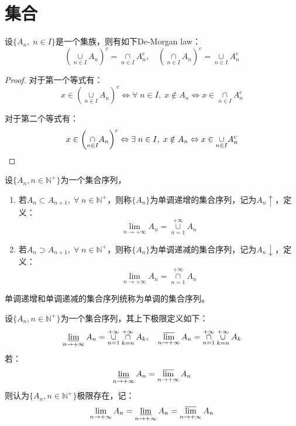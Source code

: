 \section{集合}

\begin{theorem}\label{theo:DeMorganLaw}
	设$\{A_n,\;n\in I\}$是一个集族，则有如下De-Morgan law：
	\begin{equation*}
		\left(\underset{n\in I}{\cup}A_n\right)^c=\underset{n\in I}{\cap}A_n^c,\quad
		\left(\underset{n\in I}{\cap}A_n\right)^c=\underset{n\in I}{\cup}A_n^c
	\end{equation*}
\end{theorem}
\begin{proof}
	对于第一个等式有：
	\begin{equation*}
		x\in\left(\underset{n\in I}{\cup}A_n\right)^c
		\Leftrightarrow
		\forall\;n\in I,\;x\notin A_n
		\Leftrightarrow
		x\in\underset{n\in I}{\cap}A_n^c
	\end{equation*}\par
	对于第二个等式有：
	\begin{equation*}
		x\in\left(\underset{n\in I}{\cap}A_n\right)^c
		\Leftrightarrow
		\exists\;n\in I,\;x\notin A_n
		\Leftrightarrow
		x\in\underset{n\in I}{\cup}A_n^c\qedhere
	\end{equation*}
\end{proof}
\begin{definition}
	设$\{A_n,n\in\mathbb{N}^+\}$为一个集合序列，
	\begin{enumerate}
		\item 若$A_n\subset A_{n+1},\;\forall\;n\in\mathbb{N}^+$，则称$\{A_n\}$为单调递增的集合序列，记为$A_n\uparrow$，定义：
		\begin{equation*}
			\lim_{n\to+\infty}A_n=\underset{n=1}{\overset{+\infty}{\cup}}A_n
		\end{equation*}
		\item 若$A_n\supset A_{n+1},\;\forall\;n\in\mathbb{N}^+$，则称$\{A_n\}$为单调递减的集合序列，记为$A_n\downarrow$，定义：
		\begin{equation*}
			\lim_{n\to+\infty}A_n=\underset{n=1}{\overset{+\infty}{\cap}}A_n
		\end{equation*}
	\end{enumerate}
	单调递增和单调递减的集合序列统称为单调的集合序列。
\end{definition}
\begin{definition}
	设$\{A_n,n\in\mathbb{N}^+\}$为一个集合序列，其上下极限定义如下：
	\begin{equation*}
		\varliminf_{n\to+\infty}A_n=\underset{n=1}{\overset{+\infty}{\cup}}\underset{k=n}{\overset{+\infty}{\cap}}A_k,\quad
		\varlimsup_{n\to+\infty}A_n=\underset{n=1}{\overset{+\infty}{\cap}}\underset{k=n}{\overset{+\infty}{\cup}}A_k
	\end{equation*}
	若：
	\begin{equation*}
		\varliminf_{n\to+\infty}A_n=\varlimsup_{n\to+\infty}A_n
	\end{equation*}
	则认为$\{A_n,n\in\mathbb{N}^+\}$极限存在，记：
	\begin{equation*}
		\lim_{n\to+\infty}A_n=\varliminf_{n\to+\infty}A_n=\varlimsup_{n\to+\infty}A_n
	\end{equation*}
\end{definition}
